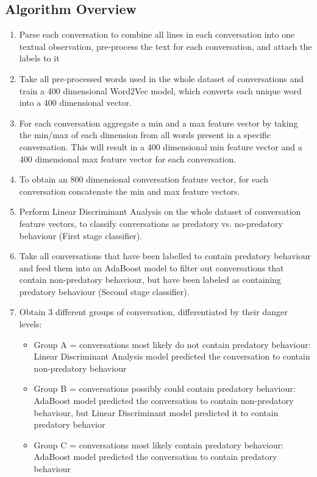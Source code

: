 \documentclass[11pt]{article}
\begin{document}
\subsection{Algorithm Overview}
\begin{enumerate}
    \item Parse each conversation to combine all lines in each conversation into one textual observation, pre-process the text for each conversation, and attach the labels to it 
    \item Take all pre-processed words used in the whole dataset of conversations and train a 400 dimensional Word2Vec model, which converts each unique word into a 400 dimensional vector.
    \item For each conversation aggregate a min and a max feature vector by taking the min/max of each dimension from all words present in a specific conversation. This will result in a 400 dimensional min feature vector and a 400 dimensional max feature vector for each conversation.
    \item To obtain an 800 dimensional conversation feature vector, for each conversation concatenate the min and max feature vectors.
    \item Perform Linear Discriminant Analysis on the whole dataset of conversation feature vectors, to classify conversations as predatory vs. no-predatory behaviour (First stage classifier).
    \item Take all conversations that have been labelled to contain predatory behaviour and feed them into an AdaBoost model to filter out conversations that contain non-predatory behaviour, but have been labeled as containing predatory behaviour (Second stage classifier).
    \item Obtain 3 different groups of conversation, differentiated by their danger levels:
    \begin{itemize}
        \item Group A = conversations most likely do not contain predatory behaviour: Linear Discriminant Analysis model predicted the conversation to contain non-predatory behaviour 
        \item Group B = conversations possibly could contain predatory behaviour: AdaBoost model predicted the conversation to contain non-predatory behaviour, but Linear Discriminant model predicted it to contain predatory behavior
        \item Group C = conversations most likely contain predatory behaviour: AdaBoost model predicted the conversation to contain predatory behaviour
    \end{itemize}
\end{enumerate}
\end{document}
